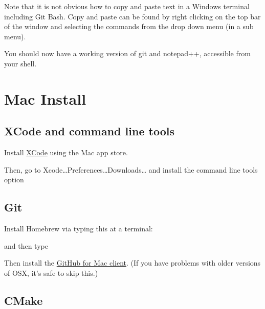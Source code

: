 Note that it is not obvious how to copy and paste text in a Windows
terminal including Git Bash. Copy and paste can be found by right
clicking on the top bar of the window and selecting the commands from
the drop down menu (in a sub menu).

You should now have a working version of git and notepad++, accessible
from your shell.

\section{Mac Install}\label{mac-install}

\subsection{XCode and command line
tools}\label{xcode-and-command-line-tools}

Install \href{https://itunes.apple.com/us/app/xcode/id497799835}{XCode}
using the Mac app store.

Then, go to Xcode\ldots{}Preferences\ldots{}Downloads\ldots{} and
install the command line tools option

\subsection{Git}\label{git-3}

Install Homebrew via typing this at a terminal:

\begin{Shaded}
\begin{Highlighting}[]
 \OtherTok{$(} \OtherTok{)}
\end{Highlighting}
\end{Shaded}

and then type

\begin{Shaded}
\begin{Highlighting}[]
 
\end{Highlighting}
\end{Shaded}

Then install the \href{http://mac.github.com}{GitHub for Mac client}.
(If you have problems with older versions of OSX, it's safe to skip
this.)

\subsection{CMake}\label{cmake-3}

